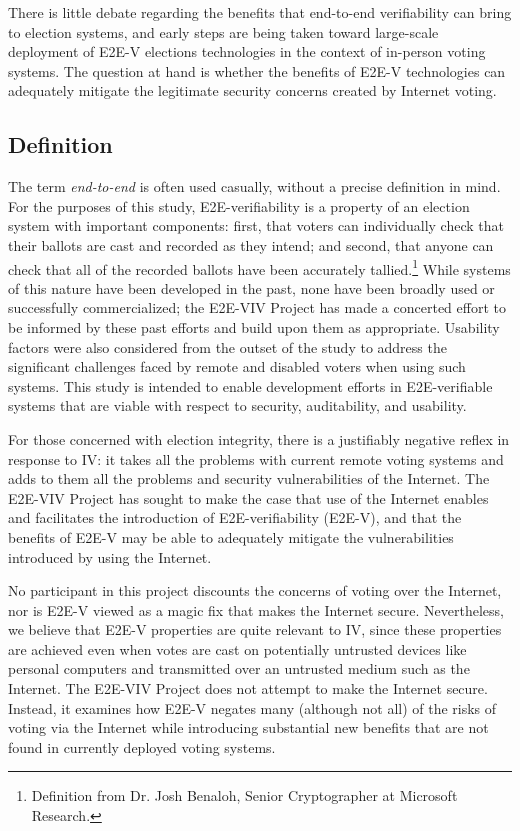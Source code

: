 There is little debate regarding the benefits that end-to-end
verifiability can bring to election systems, and early steps are being
taken toward large-scale deployment of E2E-V elections technologies in
the context of in-person voting systems. The question at hand is
whether the benefits of E2E-V technologies can adequately mitigate the
legitimate security concerns created by Internet voting.

\subsection{Definition}
\label{sec:definition}

The term \emph{end-to-end} is often used casually, without a precise
definition in mind. For the purposes of this study, E2E-verifiability
is a property of an election system with important components: first,
that voters can individually check that their ballots are cast and
recorded as they intend; and second, that anyone can check that all of
the recorded ballots have been accurately tallied.\footnote{Definition
  from Dr. Josh Benaloh, Senior Cryptographer at Microsoft Research.}
While systems of this nature have been developed in the past, none
have been broadly used or successfully commercialized; the E2E-VIV
Project has made a concerted effort to be informed by these past
efforts and build upon them as appropriate. Usability factors were
also considered from the outset of the study to address the
significant challenges faced by remote and disabled voters when using
such systems. This study is intended to enable development efforts in
E2E-verifiable systems that are viable with respect to security,
auditability, and usability.

For those concerned with election integrity, there is a justifiably
negative reflex in response to IV: it takes all the problems with
current remote voting systems and adds to them all the problems and
security vulnerabilities of the Internet. The E2E-VIV Project has
sought to make the case that use of the Internet enables and
facilitates the introduction of E2E-verifiability (E2E-V), and that
the benefits of E2E-V may be able to adequately mitigate the
vulnerabilities introduced by using the Internet.

No participant in this project discounts the concerns of voting over
the Internet, nor is E2E-V viewed as a magic fix that makes the
Internet secure. Nevertheless, we believe that E2E-V properties are
quite relevant to IV, since these properties are achieved even when
votes are cast on potentially untrusted devices like personal
computers and transmitted over an untrusted medium such as the
Internet. The E2E-VIV Project does not attempt to make the Internet
secure. Instead, it examines how E2E-V negates many (although not all)
of the risks of voting via the Internet while introducing substantial
new benefits that are not found in currently deployed voting systems.


